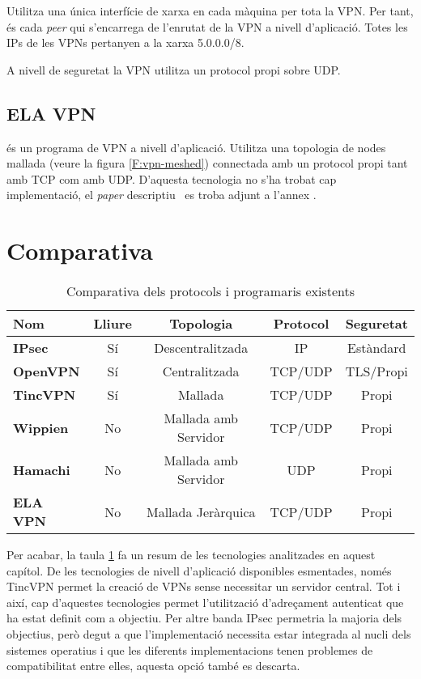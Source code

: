 Utilitza una única interfície de xarxa en cada màquina per tota la VPN. Per tant, és cada \emph{peer} qui s'encarrega de l'enrutat de la VPN a nivell d'aplicació. Totes les IPs de les VPNs pertanyen a la xarxa 5.0.0.0/8.

A nivell de seguretat la VPN utilitza un protocol propi sobre UDP.

\subsection{ELA VPN}
 és un programa de VPN a nivell d'aplicació.
Utilitza una topologia de nodes mallada (veure la figura \ref{F:vpn-meshed}) connectada amb un protocol propi tant amb TCP com amb UDP.
D'aquesta tecnologia no s'ha trobat cap implementació, el \emph{paper} descriptiu~\cite{ela} es troba adjunt a l'annex .

\section{Comparativa}
\begin{table}[htb]
\begin{center}
\begin{tabular}{|l|c|c|c|c|}
\hline
Nom & Lliure & Topologia & Protocol & Seguretat \\ \hline \hline
\bf IPsec & Sí & Descentralitzada & IP & Estàndard \\ \hline
\bf OpenVPN & Sí & Centralitzada & TCP/UDP & TLS/Propi \\ \hline
\bf TincVPN & Sí & Mallada & TCP/UDP & Propi \\ \hline
\bf Wippien & No & Mallada amb Servidor & TCP/UDP & Propi \\ \hline
\bf Hamachi & No & Mallada amb Servidor & UDP & Propi \\ \hline
\bf ELA VPN & No & Mallada Jeràrquica & TCP/UDP & Propi \\ \hline
\end{tabular}
\end{center}
\begin{center}
\caption{Comparativa dels protocols i programaris existents}
\label{T:statecomp}
\end{center}
\end{table}
Per acabar, la taula \ref{T:statecomp} fa un resum de les tecnologies analitzades en aquest capítol. De les tecnologies de nivell d'aplicació disponibles esmentades, només TincVPN permet la creació de VPNs sense necessitar un servidor central. Tot i així, cap d'aquestes tecnologies permet l'utilització d'adreçament autenticat que ha estat definit com a objectiu. Per altre banda IPsec permetria la majoria dels objectius, però degut a que l'implementació necessita estar integrada al nucli dels sistemes operatius i que les diferents implementacions tenen problemes de compatibilitat entre elles, aquesta opció també es descarta.
